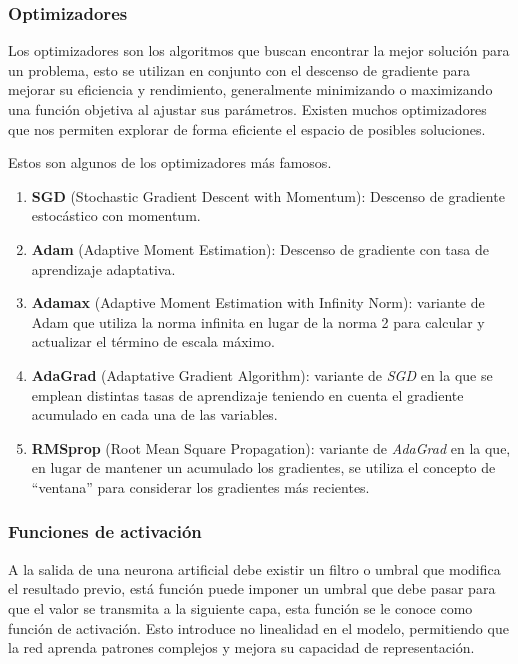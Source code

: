 
\subsubsection{Optimizadores} \label{optimizers}
Los optimizadores son los algoritmos que buscan encontrar la mejor solución para un problema, esto se utilizan en conjunto con el descenso de gradiente para mejorar su eficiencia y rendimiento, generalmente minimizando o maximizando una función objetiva al ajustar sus parámetros. Existen muchos optimizadores que nos permiten explorar de forma eficiente el espacio de posibles soluciones.


Estos son algunos de los optimizadores más famosos.
\begin{enumerate}
    \item \textbf{SGD} (Stochastic Gradient Descent with Momentum): Descenso de gradiente estocástico con momentum.
    \item \textbf{Adam} (Adaptive Moment Estimation): Descenso de gradiente con tasa de aprendizaje adaptativa.
    \item \textbf{Adamax} (Adaptive Moment Estimation with Infinity Norm):  variante de Adam que utiliza la norma infinita en lugar de la norma 2 para calcular y actualizar el término de escala máximo.
    \item \textbf{AdaGrad} (Adaptative Gradient Algorithm): variante de \textit{SGD} en la que se emplean distintas tasas de aprendizaje teniendo en cuenta el gradiente acumulado en cada una de las variables.
    \item \textbf{RMSprop} (Root Mean Square Propagation): variante de \textit{AdaGrad} en la que, en lugar de mantener un acumulado los gradientes, se utiliza el concepto de ``ventana'' para considerar los gradientes más recientes.
\end{enumerate}


\subsubsection{Funciones de activación} \label{sec:activations-functions}
A la salida de una neurona artificial debe existir un filtro o umbral que modifica el resultado previo, está función puede imponer un umbral que debe pasar para que el valor se transmita a la siguiente capa, esta función se le conoce como función de activación.
Esto introduce no linealidad en el modelo, permitiendo que la red aprenda patrones complejos y mejora su capacidad de representación.


